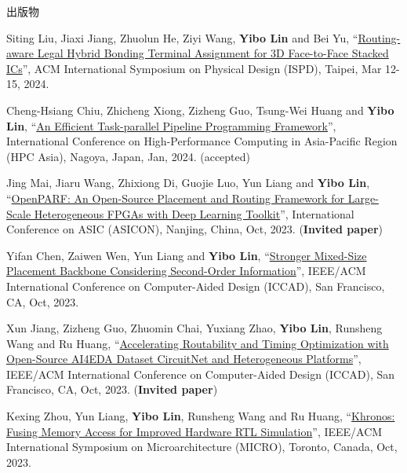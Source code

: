 \begin{rSection}{出版物}
\begin{description}[font=\normalfont, rightmargin=2em]
{}
            

\item[{[C88]}]{
        Siting Liu, Jiaxi Jiang, Zhuolun He, Ziyi Wang, \textbf{Yibo Lin} and Bei Yu, 
    ``\href{https://doi.org/10.1145/3626184.3633322}{Routing-aware Legal Hybrid Bonding Terminal Assignment for 3D Face-to-Face Stacked ICs}'', 
    ACM International Symposium on Physical Design (ISPD), Taipei, Mar 12-15, 2024.
    
}
            

\item[{[C87]}]{
        Cheng-Hsiang Chiu, Zhicheng Xiong, Zizheng Guo, Tsung-Wei Huang and \textbf{Yibo Lin}, 
    ``\href{https://doi.org/10.1145/3635035.3635037}{An Efficient Task-parallel Pipeline Programming Framework}'', 
    International Conference on High-Performance Computing in Asia-Pacific Region (HPC Asia), Nagoya, Japan, Jan, 2024.
    (accepted)
}
            

\item[{[C86]}]{
        Jing Mai, Jiaru Wang, Zhixiong Di, Guojie Luo, Yun Liang and \textbf{Yibo Lin}, 
    ``\href{https://arxiv.org/abs/2306.16665}{OpenPARF: An Open-Source Placement and Routing Framework for Large-Scale Heterogeneous FPGAs with Deep Learning Toolkit}'', 
    International Conference on ASIC (ASICON), Nanjing, China, Oct, 2023.
    (\textbf{Invited paper})
}
            

\item[{[C85]}]{
        Yifan Chen, Zaiwen Wen, Yun Liang and \textbf{Yibo Lin}, 
    ``\href{https://doi.org/10.1109/ICCAD57390.2023.10323700}{Stronger Mixed-Size Placement Backbone Considering Second-Order Information}'', 
    IEEE/ACM International Conference on Computer-Aided Design (ICCAD), San Francisco, CA, Oct, 2023.
    
}
            

\item[{[C84]}]{
        Xun Jiang, Zizheng Guo, Zhuomin Chai, Yuxiang Zhao, \textbf{Yibo Lin}, Runsheng Wang and Ru Huang, 
    ``\href{https://doi.org/10.1109/ICCAD57390.2023.10323938}{Accelerating Routability and Timing Optimization with Open-Source AI4EDA Dataset CircuitNet and Heterogeneous Platforms}'', 
    IEEE/ACM International Conference on Computer-Aided Design (ICCAD), San Francisco, CA, Oct, 2023.
    (\textbf{Invited paper})
}
            

\item[{[C83]}]{
        Kexing Zhou, Yun Liang, \textbf{Yibo Lin}, Runsheng Wang and Ru Huang, 
    ``\href{https://doi.org/10.1145/3613424.3614301}{Khronos: Fusing Memory Access for Improved Hardware RTL Simulation}'', 
    IEEE/ACM International Symposium on Microarchitecture (MICRO), Toronto, Canada, Oct, 2023.
    
}
\end{description}
\end{rSection}
